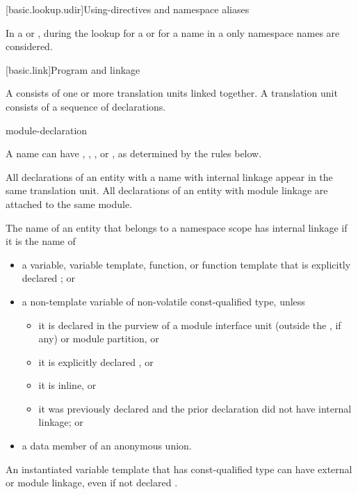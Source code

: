 [basic.lookup.udir]{Using-directives and namespace aliases}

\pnum
{}%
%
In a  or ,
during the lookup for a  or for a name in a
only namespace names are considered.%
%

[basic.link]{Program and linkage}%

\pnum
{}%
A  consists of one or more translation units
linked together. A translation unit consists
of a sequence of declarations.

\begin{bnf}
\br
    \br
     module-declaration  
\end{bnf}

\pnum
{}%
A name can have
,
,
, or
,
as determined by the rules below.
\begin{note}
All declarations of an entity with a name with internal linkage
appear in the same translation unit.
All declarations of an entity with module linkage
are attached to the same module.
\end{note}

\pnum
{}%
%
%
%
%
%
The name of an entity
that belongs to a namespace scope
has internal linkage if it is the name of
\begin{itemize}
\item
  a variable, variable template, function, or function template that is
  explicitly declared ; or
\item
  a non-template variable of non-volatile const-qualified type, unless
  \begin{itemize}
  \item it is declared in the purview of a module interface unit
    (outside the , if any) or
    module partition, or
  \item it is explicitly declared , or
  \item it is inline, or
  \item it was previously declared and the prior declaration did
  not have internal linkage; or
  \end{itemize}
\item
  a data member of an anonymous union.
\end{itemize}
\begin{note}
An instantiated variable template that has const-qualified type
can have external or module linkage, even if not declared .
\end{note}

